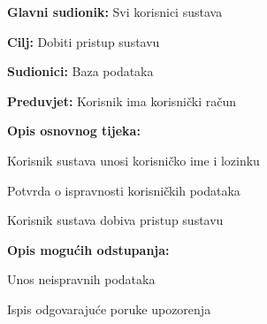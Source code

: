 					\noindent {}
				\begin{packed_item}
					
					\item \textbf{Glavni sudionik: } Svi korisnici sustava
					\item  \textbf{Cilj:} Dobiti pristup sustavu
					\item  \textbf{Sudionici:} Baza podataka
					\item  \textbf{Preduvjet:} Korisnik ima korisnički račun
					\item  \textbf{Opis osnovnog tijeka:}
					
					\item[] \begin{packed_enum}
						
						\item Korisnik sustava unosi korisničko ime i lozinku
						\item Potvrda o ispravnosti korisničkih podataka
						\item Korisnik sustava dobiva pristup sustavu
						
					\end{packed_enum}
					
					\item  \textbf{Opis mogućih odstupanja:}
					
					\item[] \begin{packed_item}
						
						\item[2.a] Unos neispravnih podataka
						\item[] \begin{packed_enum}
							
							\item Ispis odgovarajuće poruke upozorenja 
							
							
						\end{packed_enum}
						
						
					\end{packed_item}
				\end{packed_item}
			
